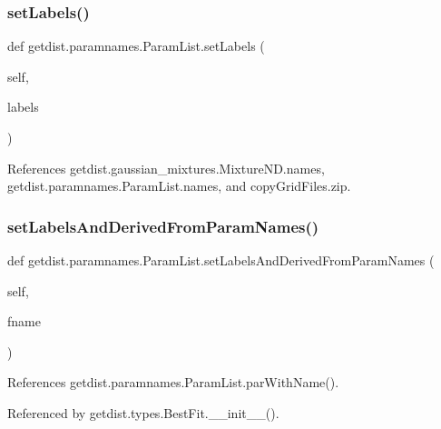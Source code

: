 \subsubsection{\texorpdfstring{set\+Labels()}{setLabels()}}
{\footnotesize\ttfamily def getdist.\+paramnames.\+Param\+List.\+set\+Labels (\begin{DoxyParamCaption}\item[{}]{self,  }\item[{}]{labels }\end{DoxyParamCaption})}



References getdist.\+gaussian\+\_\+mixtures.\+Mixture\+N\+D.\+names, getdist.\+paramnames.\+Param\+List.\+names, and copy\+Grid\+Files.\+zip.

\mbox{\label{classgetdist_1_1paramnames_1_1ParamList_a1c0f1ff83138b0ff5a99c21d43314888}} 
\subsubsection{\texorpdfstring{set\+Labels\+And\+Derived\+From\+Param\+Names()}{setLabelsAndDerivedFromParamNames()}}
{\footnotesize\ttfamily def getdist.\+paramnames.\+Param\+List.\+set\+Labels\+And\+Derived\+From\+Param\+Names (\begin{DoxyParamCaption}\item[{}]{self,  }\item[{}]{fname }\end{DoxyParamCaption})}



References getdist.\+paramnames.\+Param\+List.\+par\+With\+Name().



Referenced by getdist.\+types.\+Best\+Fit.\+\_\+\+\_\+init\+\_\+\+\_\+().

